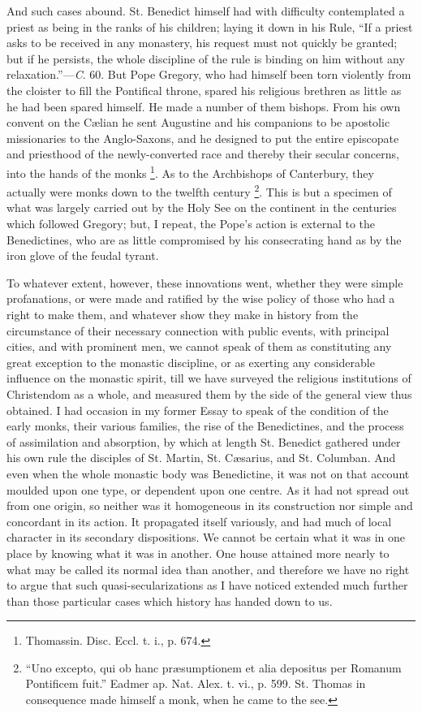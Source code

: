 And such cases abound. St. Benedict himself had with difficulty
contemplated a priest as being in the ranks of his children; laying it
down in his Rule, ``If a priest asks to be received in any
monastery, his request must not quickly be granted; but if he
persists, the whole discipline of the rule is binding on him without
any relaxation.''—\emph{C}. 60. But Pope Gregory, who had
himself been torn violently from the cloister to fill the Pontifical
throne, spared his religious brethren as little as he had been spared
himself. He made a number of them bishops. From his own convent on the
Cælian he sent Augustine and his companions to be apostolic
missionaries to the Anglo-Saxons, and he designed to put the entire
episcopate and priesthood of the newly-converted race and thereby
their secular concerns, into the hands of the monks \footnote{Thomassin.
Disc. Eccl. t. i., p. 674.}. As to the Archbishops of Canterbury, they actually were monks
down to the twelfth century \footnote{``Uno
excepto, qui ob hanc præsumptionem et alia depositus per Romanum
Pontificem fuit.'' Eadmer ap. Nat. Alex. t. vi., p. 599. St.
Thomas in consequence made himself a monk, when he came to the see.}.
This is but a specimen of what was largely carried out by the
Holy See on the continent in the centuries which followed Gregory;
but, I repeat, the Pope's action is external to the Benedictines, who
are as little compromised by his consecrating hand as by the iron
glove of the feudal tyrant.

To whatever extent, however, these innovations went, whether they
were simple profanations, or were made and ratified by the wise policy
of those who had a right to make them, and whatever show they make in
history from the circumstance of their necessary connection with
public events, with principal cities, and with prominent men, we
cannot speak of them as constituting any great exception to the
monastic discipline, or as exerting any considerable influence on the
monastic spirit, till we have surveyed the religious institutions of
Christendom as a whole, and measured them by the side of the general
view thus obtained. I had occasion in my former Essay to speak of the
condition of the early monks, their various families, the rise of the
Benedictines, and the process of assimilation and absorption, by which
at length St. Benedict gathered under his own rule the disciples of
St. Martin, St. Cæsarius, and St. Columban. And even when the whole
monastic body was Benedictine, it was not on that account moulded upon
one type, or dependent upon one centre. As it had not spread out from
one origin, so neither was it homogeneous in its construction nor
simple and concordant in its action. It propagated itself variously,
and had much of local character in its secondary dispositions. We
cannot be certain what it was in one place by knowing what it was in
another. One house attained more nearly to what may be called its
normal idea than another, and therefore we have no right to argue that
such quasi-secularizations as I have noticed extended much
further than those particular cases which history has handed down to
us.

